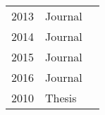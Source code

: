 \begin{table}[]
\begin{tabular}{lll}
2013          & Journal          & \cite{Malik2013a}\cite{Wang2013}\cite{Wert2013a}\cite{Talbi2013}\cite{Barna2013}                    \\
2014          & Journal          & \cite{Wert2014}                                                                     \\
2015          & Journal          & \cite{Jiang2015}\cite{Luo2015}                                                      \\
2016          & Journal          & \cite{Vogele2016}                                                                  \\
2010          & Thesis           & \cite{Jiang2010}                                                                   
\end{tabular}
\end{table}


